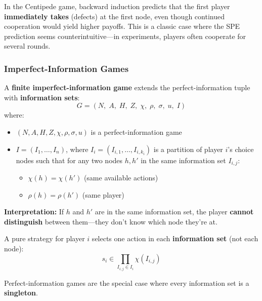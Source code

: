 \begin{exbox}
In the Centipede game, backward induction predicts that the first player \textbf{immediately takes} (defects) at the first node, even though continued cooperation would yield higher payoffs. This is a classic case where the SPE prediction seems counterintuitive---in experiments, players often cooperate for several rounds.
\end{exbox}

\bigseparator

\subsubsection{Imperfect-Information Games}

\begin{defbox}
A \textbf{finite imperfect-information game} extends the perfect-information tuple with \textbf{information sets}:
\[
G = (N,\; A,\; H,\; Z,\; \chi,\; \rho,\; \sigma,\; u,\; I)
\]
where:
\begin{itemize}
  \item $(N, A, H, Z, \chi, \rho, \sigma, u)$ is a perfect-information game
  \item $I = (I_1, \ldots, I_n)$, where $I_i = (I_{i,1}, \ldots, I_{i,k_i})$ is a partition of player $i$'s choice nodes such that for any two nodes $h, h'$ in the same information set $I_{i,j}$:
  \begin{itemize}
    \item $\chi(h) = \chi(h')$ \quad (same available actions)
    \item $\rho(h) = \rho(h')$ \quad (same player)
  \end{itemize}
\end{itemize}

\textbf{Interpretation:} If $h$ and $h'$ are in the same information set, the player \textbf{cannot distinguish} between them---they don't know which node they're at.
\end{defbox}

\begin{defbox}
A pure strategy for player $i$ selects one action in each \textbf{information set} (not each node):
\[
s_i \in \prod_{I_{i,j} \in I_i} \chi(I_{i,j})
\]

Perfect-information games are the special case where every information set is a \textbf{singleton}.
\end{defbox}


